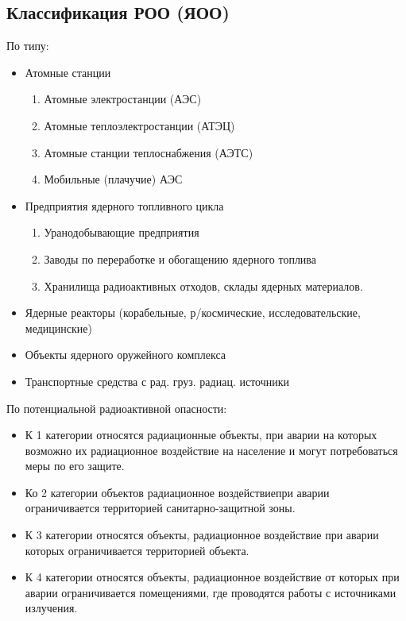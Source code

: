 \documentclass[a4paper, 12pt]{article}
\theoremstyle{definition}
\begin{document}
        \subsection{Классификация РОО (ЯОО)}
        По типу:
        \begin{itemize}
            \item Атомные станции \begin{enumerate}
                \item Атомные электростанции (АЭС)
                \item Атомные теплоэлектростанции (АТЭЦ)
                \item Атомные станции теплоснабжения (АЭТС)
                \item Мобильные (плачучие) АЭС
                \end{enumerate}
            \item Предприятия ядерного топливного цикла 
                \begin{enumerate}
                    \item Уранодобывающие предприятия
                    \item Заводы по переработке и обогащению ядерного топлива
                    \item Хранилища радиоактивных отходов, склады ядерных материалов.
                \end{enumerate}
            \item Ядерные реакторы (корабельные, р/космические, исследовательские, медицинские)
            \item Объекты ядерного оружейного комплекса
            \item Транспортные средства с рад. груз. радиац. источники
        \end{itemize}
        По потенциальной радиоактивной опасности:
        \begin{itemize}
            \item К 1 категории относятся радиационные объекты, при аварии на которых возможно их радиационное воздействие на население и могут потребоваться меры по его защите.
            \item Ко 2 категории объектов радиационное воздействиепри аварии ограничивается территорией санитарно-защитной зоны.
            \item К 3 категории относятся объекты, радиационное воздействие при аварии которых ограничивается территорией объекта.
            \item К 4 категории относятся объекты, радиационное воздействие от которых при аварии ограничивается помещениями, где проводятся работы с источниками излучения.
        \end{itemize}
\end{document}
